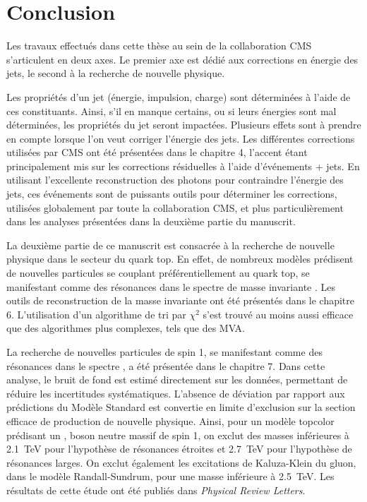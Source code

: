 \chapter*{Conclusion}

Les travaux effectués dans cette thèse au sein de la collaboration CMS s'articulent en deux axes. Le premier axe est dédié aux corrections en énergie des jets, le second à la recherche de nouvelle physique.

\medskip

Les propriétés d'un jet (énergie, impulsion, charge) sont déterminées à l'aide de ces constituants. Ainsi, s'il en manque certains, ou si leurs énergies sont mal déterminées, les propriétés du jet seront impactées. Plusieurs effets sont à prendre en compte lorsque l'on veut corriger l'énergie des jets. Les différentes corrections utilisées par CMS ont été présentées dans le chapitre 4, l'accent étant principalement mis sur les corrections résiduelles à l'aide d'événements \Pgamma + jets. En utilisant l'excellente reconstruction des photons pour contraindre l'énergie des jets, ces événements sont de puissants outils pour déterminer les corrections, utilisées globalement par toute la collaboration CMS, et plus particulièrement dans les analyses présentées dans la deuxième partie du manuscrit.

\bigskip

La deuxième partie de ce manuscrit est consacrée à la recherche de nouvelle physique dans le secteur du quark top. En effet, de nombreux modèles prédisent de nouvelles particules se couplant préférentiellement au quark top, se manifestant comme des résonances dans le spectre de masse invariante \ttbar. Les outils de reconstruction de la masse invariante ont été présentés dans le chapitre 6. L'utilisation d'un algorithme de tri par $\chi^2$ s'est trouvé au moins aussi efficace que des algorithmes plus complexes, tels que des MVA.

\smallskip

La recherche de nouvelles particules de spin 1, se manifestant comme des résonances dans le spectre \mtt, a été présentée dans le chapitre 7. Dans cette analyse, le bruit de fond est estimé directement sur les données, permettant de réduire les incertitudes systématiques. L'absence de déviation par rapport aux prédictions du Modèle Standard est convertie en limite d'exclusion sur la section efficace de production de nouvelle physique. Ainsi, pour un modèle topcolor prédisant un \zprime, boson neutre massif de spin 1, on exclut des masses inférieures à \SI{2.1}{\TeV} pour l'hypothèse de résonances étroites et \SI{2.7}{\TeV} pour l'hypothèse de résonances larges. On exclut également les excitations de Kaluza-Klein du gluon, dans le modèle Randall-Sundrum, pour une masse inférieure à \SI{2.5}{\TeV}. Les résultats de cette étude ont été publiés dans \emph{Physical Review Letters}.

